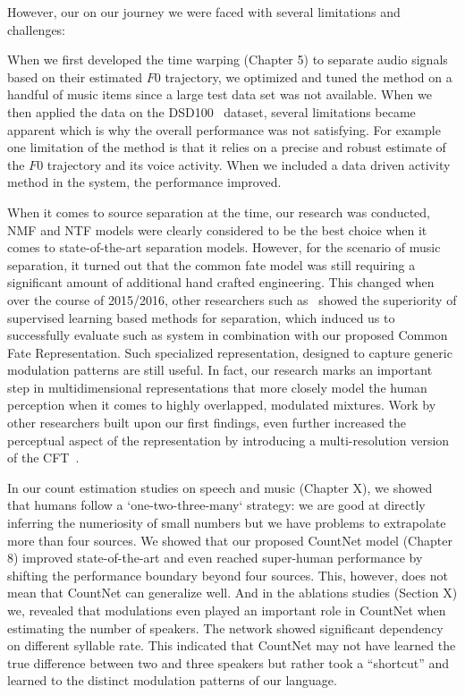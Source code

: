 However, our on our journey we were faced with several limitations and challenges:
\par
When we first developed the time warping (Chapter 5) to separate audio signals based on their estimated \(F0\) trajectory, we optimized and tuned the method on a handful of music items since a large test data set was not available. When we then applied the data on the DSD100~\cite{} dataset, several limitations became apparent which is why the overall performance was not satisfying. For example one limitation of the method is that it relies on a precise and robust estimate of the \(F0\) trajectory and its voice activity. When we included a data driven activity method in the system, the performance improved.
\par
When it comes to source separation at the time, our research was conducted, NMF and NTF models were clearly considered to be the best choice when it comes to state-of-the-art separation models. 
However, for the scenario of music separation, it turned out that the common fate model was still requiring a significant amount of additional hand crafted engineering.
This changed when over the course of 2015/2016, other researchers such as~\cite{uhlich15, nugraha162} showed the superiority of supervised learning based methods for separation, which induced us to successfully evaluate such as system in combination with our proposed Common Fate Representation.
Such specialized representation, designed to capture generic modulation patterns are still useful.
In fact, our research marks an important step in multidimensional representations that more closely model the human perception when it comes to highly overlapped, modulated mixtures. Work by other researchers built upon our first findings, even further increased the perceptual aspect of the representation by introducing a multi-resolution version of the CFT~\cite{seetharaman17, pishdadian18}.
\par
In our count estimation studies on speech and music (Chapter X), we showed that humans follow a `one-two-three-many` strategy: we are good at directly inferring the numeriosity of small numbers but we have problems to extrapolate more than four sources.
We showed that our proposed CountNet model (Chapter 8) improved state-of-the-art and even reached super-human performance by shifting the performance boundary beyond four sources. This, however, does not mean that CountNet can generalize well.
And in the ablations studies (Section X) we, revealed that modulations even played an important role in CountNet when estimating the number of speakers.
The network showed significant dependency on different syllable rate. This indicated that CountNet may not have learned the true difference between two and three speakers but rather took a ``shortcut'' and learned to the distinct modulation patterns of our language.


